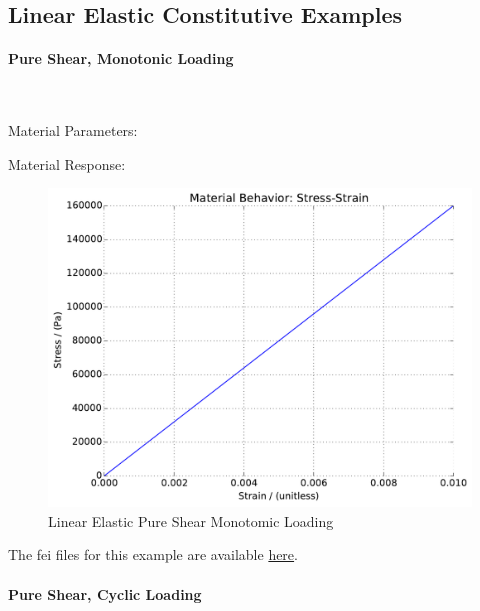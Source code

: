 \documentclass[fleqn,11pt]{article}
\begin{document}
\subsection{Linear Elastic Constitutive Examples}

\paragraph{Pure Shear, Monotonic Loading} ~ 

Material Parameters:


Material Response:
\begin{figure}[H]
\begin{center}
\includegraphics[width=12cm]{../fei_examples/linear_elastic/1pure_shear_mono_loading/result.pdf}
\caption{
\label{constitutive_linear_elastic Pure Shear Monotomic Loadin}
Linear Elastic Pure Shear Monotomic Loading}
\end{center}
\end{figure}

The fei files for this example are available \href{https://github.com/yuan-energy/education_examples/tree/master/fei_examples/linear_elastic/1pure_shear_mono_loading}{here}.

\newpage
\paragraph{Pure Shear, Cyclic Loading} ~ 
\end{document}
